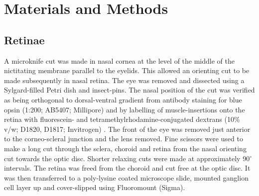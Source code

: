 \documentclass[10pt]{article}
\begin{document}


\section*{Materials and Methods}
\label{retistruct_plos:sec:materials-methods}

\subsection*{Retinae}
\label{retistruct_plos:sec:retinae}

A microknife cut was made in nasal cornea at the level of the middle
of the nictitating membrane parallel to the eyelids. This allowed an
orienting cut to be made subsequently in nasal retina. The eye was
removed and dissected using a Sylgard-filled Petri dish and
insect-pins. The nasal position of the cut was verified as being
orthogonal to dorsal-ventral gradient from antibody staining for blue
opsin (1:200; AB5407; Millipore) and by labelling of muscle-insertions
onto the retina with fluorescein- and tetramethylrhodamine-conjugated
dextrans (10\% v/w; D1820, D1817; Invitrogen)
. The front of the eye was
removed just anterior to the corneo-scleral junction and the lens
removed. Fine scissors were used to make a long cut through the
sclera, choroid and retina from the nasal orienting cut towards the
optic disc. Shorter relaxing cuts were made at approximately
90$^\circ$ intervals. The retina was freed from the choroid and cut
free at the optic disc. It was then transferred to a poly-lysine
coated microscope slide, mounted ganglion cell layer up and
cover-slipped using Fluoromount (Sigma).
\end{document}
